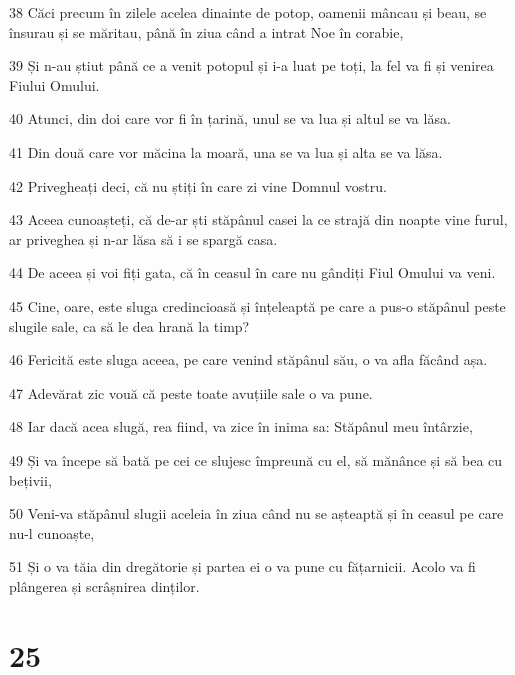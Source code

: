 \par 38 Căci precum în zilele acelea dinainte de potop, oamenii mâncau și beau, se însurau și se măritau, până în ziua când a intrat Noe în corabie,
\par 39 Și n-au știut până ce a venit potopul și i-a luat pe toți, la fel va fi și venirea Fiului Omului.
\par 40 Atunci, din doi care vor fi în țarină, unul se va lua și altul se va lăsa.
\par 41 Din două care vor măcina la moară, una se va lua și alta se va lăsa.
\par 42 Privegheați deci, că nu știți în care zi vine Domnul vostru.
\par 43 Aceea cunoașteți, că de-ar ști stăpânul casei la ce strajă din noapte vine furul, ar priveghea și n-ar lăsa să i se spargă casa.
\par 44 De aceea și voi fiți gata, că în ceasul în care nu gândiți Fiul Omului va veni.
\par 45 Cine, oare, este sluga credincioasă și înțeleaptă pe care a pus-o stăpânul peste slugile sale, ca să le dea hrană la timp?
\par 46 Fericită este sluga aceea, pe care venind stăpânul său, o va afla făcând așa.
\par 47 Adevărat zic vouă că peste toate avuțiile sale o va pune.
\par 48 Iar dacă acea slugă, rea fiind, va zice în inima sa: Stăpânul meu întârzie,
\par 49 Și va începe să bată pe cei ce slujesc împreună cu el, să mănânce și să bea cu bețivii,
\par 50 Veni-va stăpânul slugii aceleia în ziua când nu se așteaptă și în ceasul pe care nu-l cunoaște,
\par 51 Și o va tăia din dregătorie și partea ei o va pune cu fățarnicii. Acolo va fi plângerea și scrâșnirea dinților.

\chapter{25}

